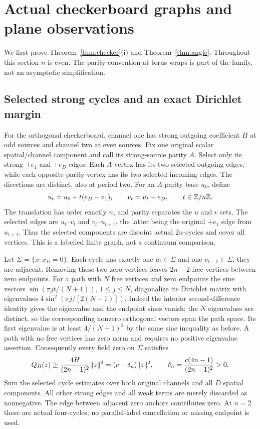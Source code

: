 \section{Actual checkerboard graphs and plane observations}\label{sec:checkerproof}
We first prove Theorem~\ref{thm:checker}(i) and Theorem~\ref{thm:angle}.
Throughout this section $n$ is even. The parity convention at torus wraps is
part of the family, not an asymptotic simplification.

\subsection{Selected strong cycles and an exact Dirichlet margin}
For the orthogonal checkerboard, channel one has strong outgoing coefficient
$H$ at odd sources and channel two at even sources. Fix one original scalar
spatial/channel component and call its strong-source parity $A$.
Select only its strong $+e_1$ and $+e_D$ edges. Each $A$ vertex has its two
selected outgoing edges, while each opposite-parity vertex has its two
selected incoming edges. The directions are distinct, also at period two.
For an $A$-parity base $u_0$, define
\[
 u_t=u_0+t(e_D-e_1),\qquad v_t=u_t+e_D,\qquad t\in\mathbb Z/n\mathbb Z.
\]
The translation has order exactly $n$, and parity separates the $u$ and $v$
sets. The selected edges are $u_t$--$v_t$ and $v_t$--$u_{t+1}$, the latter
being the original $+e_1$ edge from $u_{t+1}$. Thus the selected components
are disjoint actual $2n$-cycles and cover all vertices. This is a labelled
finite graph, not a continuum comparison.

Let $\Sigma=\{x:x_D=0\}$. Each cycle has exactly one $u_t\in\Sigma$ and
one $v_{t-1}\in\Sigma$; they are adjacent. Removing these two zero vertices
leaves $2n-2$ free vertices between zero endpoints.
For a path with $N$ free vertices and zero endpoints the sine vectors
$\sin(\pi jt/(N+1))$, $1\leq j\leq N$, diagonalize its Dirichlet matrix
with eigenvalues $4\sin^2(\pi j/[2(N+1)])$.
Indeed the interior second-difference identity gives the eigenvalue and the
endpoint sines vanish; the $N$ eigenvalues are distinct, so the corresponding
nonzero orthogonal vectors span the path space. Its first eigenvalue is at
least $4/(N+1)^2$ by the same sine inequality as before. A path with no free
vertices has zero norm and requires no positive eigenvalue assertion.
Consequently every field zero on $\Sigma$ satisfies
\begin{equation}\label{eq:singleplane-gap}
 Q_B(z)\geq\frac{4H}{(2n-1)^2}\lVert z\rVert^2
       =(c+\delta_n)\lVert z\rVert^2,
 \qquad\delta_n=\frac{c(4n-1)}{(2n-1)^2}>0.
\end{equation}
Sum the selected cycle estimates over both original channels and all $D$
spatial components. All other strong edges and all weak terms are merely
discarded as nonnegative. The edge between adjacent zero anchors contributes
zero. At $n=2$ these are actual four-cycles; no parallel-label cancellation
or missing endpoint is used.

